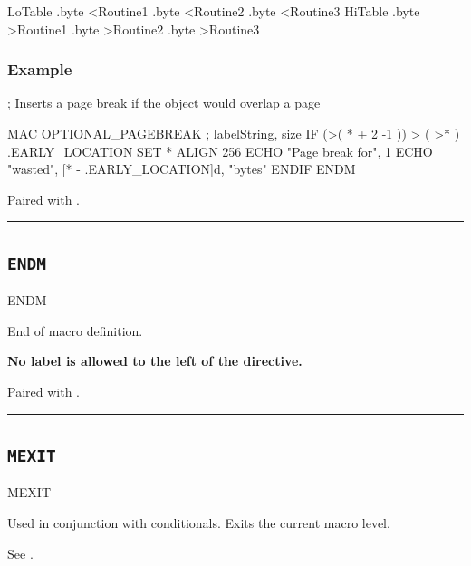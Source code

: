 \begin{code}[caption=Output]
LoTable
	.byte <Routine1
	.byte <Routine2
	.byte <Routine3
HiTable
	.byte >Routine1
	.byte >Routine2
	.byte >Routine3
	
	\end{code}
		
\subsubsection{Example}

\begin{code}
; Inserts a page break if the object would overlap a page

  MAC OPTIONAL_PAGEBREAK ; { labelString, size }
    IF (>( * + {2} -1 )) > ( >* )
.EARLY_LOCATION  SET *
      ALIGN 256
        ECHO "Page break for", {1}
        ECHO "wasted", [* - .EARLY_LOCATION]d, "bytes"
    ENDIF
  ENDM
\end{code}		
		
		
		
Paired with .\\

\hrule

	
\subsection{\texttt{ENDM}}
\label{pseudoop:endm}
	
\begin{usage}
  ENDM
\end{usage}
		
		End of macro definition.
		
		\textbf{No label is allowed to the left of the directive.}

Paired with .\\
		
\hrule
		
\subsection{\texttt{MEXIT}}

\begin{usage}
  MEXIT
\end{usage}

Used in conjunction with conditionals.  Exits the current macro level.

See .


